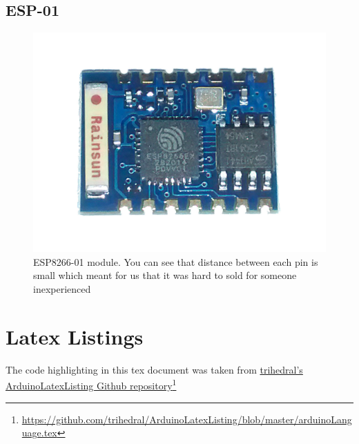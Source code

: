 \documentclass[a4paper,12pt,oneside,openright,titlepage]{book}
\newcommand\citeurl[2]{%
  \href{#1}{#2}\footnote{\url{#1}}%
}
\begin{document}
\section{ESP-01}
\begin{figure}[!ht]
	\centering
		\includegraphics[scale=0.20]{ESP-01}
	\caption{ESP8266-01 module. You can see that distance between each pin is small which meant for us that it was hard to sold for someone inexperienced}
	\label{fig:ESP}
\end{figure}

\chapter{Latex Listings}
The code highlighting in this tex document was taken from \citeurl{https://github.com/trihedral/ArduinoLatexListing/blob/master/arduinoLanguage.tex}{trihedral's ArduinoLatexListing Github repository}
\end{document}
